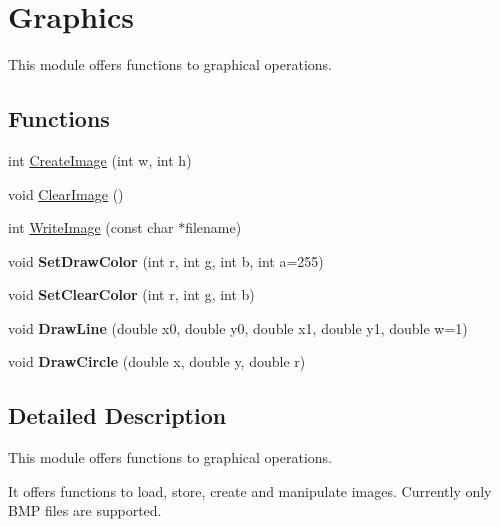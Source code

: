\hypertarget{group__graphics__group}{}\section{Graphics}
\label{group__graphics__group}


This module offers functions to graphical operations.  


\subsection*{Functions}
\begin{DoxyCompactItemize}
\item 
int \hyperlink{group__graphics__group_ga8462a895186f3534786c30df8fd9747e}{Create\+Image} (int w, int h)
\item 
void \hyperlink{group__graphics__group_gaf45b0118bad60d88a6c50d841106bc4a}{Clear\+Image} ()
\item 
int \hyperlink{group__graphics__group_ga7a92adcfb955193d1a9e91891cd390e0}{Write\+Image} (const char $\ast$filename)
\item 
\mbox{\label{group__graphics__group_ga1173670691ccdb478d5a23e4e40e9370}} 
void {\bfseries Set\+Draw\+Color} (int r, int g, int b, int a=255)
\item 
\mbox{\label{group__graphics__group_ga3bb72e859437ed28549062ac7be27d8d}} 
void {\bfseries Set\+Clear\+Color} (int r, int g, int b)
\item 
\mbox{\label{group__graphics__group_ga78d85558d42849decf7f85ae93b42044}} 
void {\bfseries Draw\+Line} (double x0, double y0, double x1, double y1, double w=1)
\item 
\mbox{\label{group__graphics__group_gae85b79bdf3eca6e115ca27ab9d4a3fcc}} 
void {\bfseries Draw\+Circle} (double x, double y, double r)
\end{DoxyCompactItemize}


\subsection{Detailed Description}
This module offers functions to graphical operations. 

It offers functions to load, store, create and manipulate images. Currently only B\+MP files are supported. 

